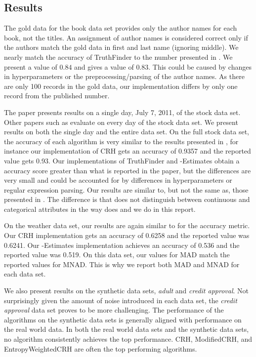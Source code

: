 \documentclass{acm_proc_article-sp}
\begin{document}
\subsection{Results} \label{sec:results}

The gold data for the book data set provides only the author names for each book, not the titles. An assignment of author names is considered correct only if the authors  match the gold data in first and last name (ignoring middle). We nearly match the accuracy of {\sc TruthFinder } to the number presented in \cite{dong:integrating}. We present a value of $0.84$ and \cite{dong:integrating} gives a value of $0.83$. This could be caused by changes in hyperparameters or the preprocessing/parsing of the author names. As there are only 100 records in the gold data, our implementation differs by only one record from the published number. 

The paper \cite{li:truth} presents results on a single day, July 7, 2011, of the stock data set. Other papers such as \cite{li:resolving} evaluate on every day of the stock data set. We present results on both the single day and the entire data set. On the full stock data set, the accuracy of each algorithm is very similar to the results presented in \cite{li:resolving}, for instance our implementation of CRH gets an accuracy of 0.9357 and the reported value gets 0.93. Our implementations of {\sc TruthFinder} and {-Estimates} obtain a accuracy score greater than what is reported in the paper, but the differences are very small and could be accounted for by differences in hyperparameters or regular expression parsing. Our results are similar to, but not the same as, those presented in \cite{li:truth}. The difference is that \cite{li:truth} does not distinguish between continuous and categorical attributes in the way \cite{li:resolving} does and we do in this report.  

On the weather data set, our results are again similar to \cite{li:truth} for the accuracy  metric. Our {\sc CRH} implementation gets an accuracy of 0.6258 and the reported value was 0.6241. Our {-Estimates} implementation  achieves an accuracy of 0.536 and the reported value was 0.519. On this data set, our values for MAD match the reported values for MNAD. This is why we report both MAD and MNAD for each data set. 

We also present results on the synthetic data sets, \emph{adult} and \emph{credit approval}. Not surprisingly given the amount of noise introduced in each data set, the \emph{credit approval} data set proves to be more challenging. The performance of the algorithms on the synthetic data sets is generally aligned with performance on the real world data. In both the real world data sets and the synthetic data sets, no algorithm consistently achieves the top performance. {\sc CRH}, {\sc ModifiedCRH}, and {\sc EntropyWeightedCRH} are often the top performing algorithms.   
\end{document}
